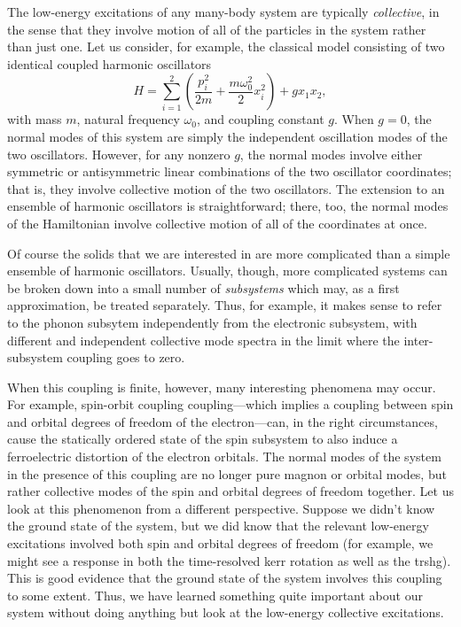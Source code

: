 The low-energy excitations of any many-body system are typically \emph{collective}, in the sense that they involve motion of all of the particles in the system rather than just one.
Let us consider, for example, the classical model consisting of two identical coupled harmonic oscillators
\begin{equation}
H = \sum_{i=1}^2\left(\frac{p_i^2}{2m}+\frac{m\omega_0^2}{2}x_i^2\right)+gx_1x_2,
\end{equation}
with mass $m$, natural frequency $\omega_0$, and coupling constant $g$.
When $g=0$, the normal modes of this system are simply the independent oscillation modes of the two oscillators.
However, for any nonzero $g$, the normal modes involve either symmetric or antisymmetric linear combinations of the two oscillator coordinates; that is, they involve collective motion of the two oscillators.
The extension to an ensemble of harmonic oscillators is straightforward; there, too, the normal modes of the Hamiltonian involve collective motion of all of the coordinates at once.

Of course the solids that we are interested in are more complicated than a simple ensemble of harmonic oscillators.
Usually, though, more complicated systems can be broken down into a small number of \emph{subsystems} which may, as a first approximation, be treated separately.
Thus, for example, it makes sense to refer to the phonon subsytem independently from the electronic subsystem, with different and independent collective mode spectra in the limit where the inter-subsystem coupling goes to zero.

When this coupling is finite, however, many interesting phenomena may occur.
For example, spin-orbit coupling coupling---which implies a coupling between spin and orbital degrees of freedom of the electron---can, in the right circumstances, cause the statically ordered state of the spin subsystem to also induce a ferroelectric distortion of the electron orbitals.
The normal modes of the system in the presence of this coupling are no longer pure magnon or orbital modes, but rather collective modes of the spin and orbital degrees of freedom together.
Let us look at this phenomenon from a different perspective.
Suppose we didn't know the ground state of the system, but we did know that the relevant low-energy excitations involved both spin and orbital degrees of freedom (for example, we might see a response in both the time-resolved kerr rotation as well as the \gls{trshg}).
This is good evidence that the ground state of the system involves this coupling to some extent.
Thus, we have learned something quite important about our system without doing anything but look at the low-energy collective excitations.

